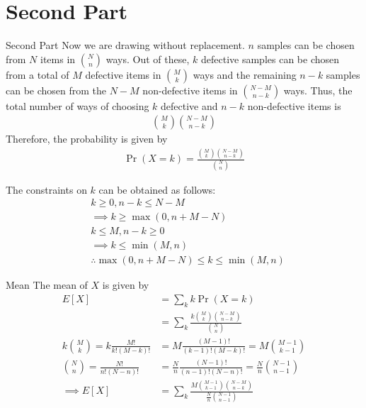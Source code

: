 \documentclass{beamer}
\providecommand{\pr}[1]{\ensuremath{\Pr\left(#1\right)}}
\begin{document}
	\section{Second Part}
	\begin{frame}{Second Part}
	Now we are drawing without replacement. $n$ samples can be chosen from $N$ items in $\binom{N}{n}$ ways. Out of these, $k$ defective samples can be chosen from a total of $M$ defective items in $\binom{M}{k}$ ways and the remaining $n-k$ samples can be chosen from the $N-M$ non-defective items in $\binom{N-M}{n-k}$ ways. Thus, the total number of ways of choosing $k$ defective and $n-k$ non-defective items is 
	\begin{align}
		\binom{M}{k} \binom{N-M}{n-k}
	\end{align}
	Therefore, the probability is given by
	\begin{align}
		\pr{X=k} = \frac{\binom{M}{k} \binom{N-M}{n-k}}{\binom{N}{n}}
	\end{align}
	\end{frame}
	
	\begin{frame}
	The constraints on $k$ can be obtained as follows:
	\begin{align}
		&k \ge 0, n-k \le N-M \\
		&\implies k \ge \max(0, n+M-N) \\
		&k \le M, n - k \ge 0 \\
		&\implies k \le \min(M,n) \\
		&\therefore \max(0, n+M-N) \le k \le \min(M,n)
	\end{align}	 
	\end{frame}
	
	\begin{frame}{Mean}
	The mean of $X$ is given by
	\begin{align}
		E[X] &= \sum_k k \pr{X=k} \\
		&= \sum_k \frac{k \binom{M}{k} \binom{N-M}{n-k}}{\binom{N}{n}} \\
		k \binom{M}{k} = k \frac{M!}{k!(M-k)!} &= M \frac{(M-1)!}{(k-1)!(M-k)!} = M \binom{M-1}{k-1} \\
		\binom{N}{n} = \frac{N!}{n!(N-n)!} &= \frac{N}{n} \frac{(N-1)!}{(n-1)!(N-n)!} = \frac{N}{n} \binom{N-1}{n-1} \\
		\implies E[X] &= \sum_k \frac{M \binom{M-1}{k-1} \binom{N-M}{n-k}}{\frac{N}{n} \binom{N-1}{n-1}} 
	\end{align}
	\end{frame}
	
\end{document}
